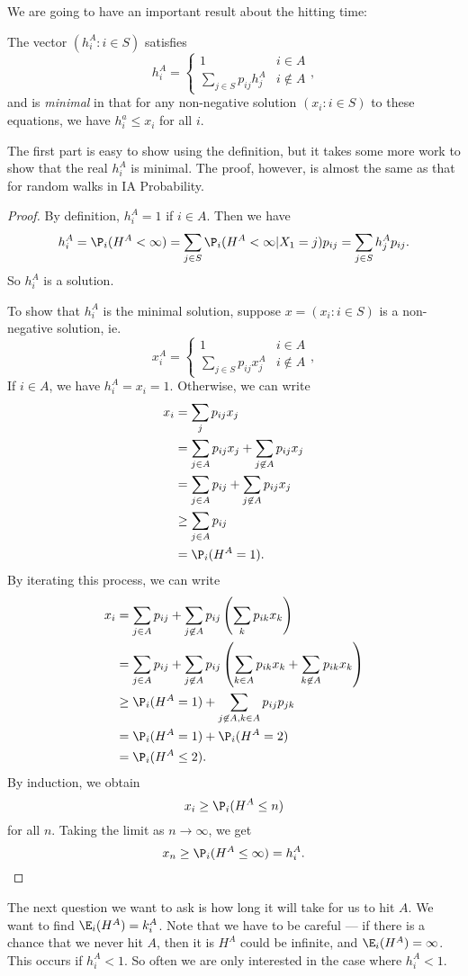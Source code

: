 \documentclass[a4paper]{article}
\begin{document}
We are going to have an important result about the hitting time:
\begin{thm}
  The vector $(h_i^A: i \in S)$ satisfies
  \[
    h_i^A =
    \begin{cases}
      1 & i \in A\\
      \sum_{j \in S}p_{ij}h_j^A & i \not \in A
    \end{cases},
  \]
  and is \emph{minimal} in that for any non-negative solution $(x_i: i \in S)$ to these equations, we have $h_i^a \leq x_i$ for all $i$.
\end{thm}
The first part is easy to show using the definition, but it takes some more work to show that the real $h_i^A$ is minimal. The proof, however, is almost the same as that for random walks in IA Probability.

\begin{proof}
  By definition, $h_i^A = 1$ if $i \in A$. Then we have
  \[
    h_i^A = \P_i(H^A < \infty) = \sum_{j\in S} \P_i(H^A < \infty | X_1 = j)p_{ij} = \sum_{j\in S}h_{j}^A p_{ij}.
  \]
  So $h_i^A$ is a solution.

  To show that $h_i^A$ is the minimal solution, suppose $x = (x_i: i \in S)$ is a non-negative solution, ie.
  \[
    x_i^A =
    \begin{cases}
      1 & i \in A\\
      \sum_{j \in S}p_{ij}x_j^A & i \not \in A
    \end{cases},
  \]
  If $i \in A$, we have $h_i^A = x_i = 1$. Otherwise, we can write
  \begin{align*}
    x_i &= \sum_j p_{ij}x_j \\
    &= \sum_{j \in A}p_{ij}x_j + \sum_{j \not\in A}p_{ij}x_j \\
    &= \sum_{j \in A}p_{ij} + \sum_{j \not\in A}p_{ij}x_j \\
    &\geq \sum_{j \in A}p_{ij}\\
    &= \P_i(H^A = 1).
  \end{align*}
  By iterating this process, we can write
  \begin{align*}
    x_i &= \sum_{j \in A} p_{ij} + \sum_{j \not\in A} p_{ij}\left(\sum_k p_{ik} x_k\right) \\
    &= \sum_{j \in A} p_{ij} + \sum_{j \not\in A} p_{ij}\left(\sum_{k\in A} p_{ik} x_k + \sum_{k \not\in A} p_{ik}x_k\right)\\
    &\geq \P_i (H^A = 1) + \sum_{j \not \in A, k \in A}p_{ij}p_{jk}\\
    &= \P_i(H^A = 1) + \P_i(H^A = 2)\\
    &= \P_i (H^A \leq 2).
  \end{align*}
  By induction, we obtain
  \[
    x_i \geq \P_i(H^A \leq n)
  \]
  for all $n$. Taking the limit as $n \to \infty$, we get
  \[
    x_n \geq \P_i(H^A \leq \infty) = h_i^A.
  \]
\end{proof}
The next question we want to ask is how long it will take for us to hit $A$. We want to find $\E_i(H^A) = k_i^A$. Note that we have to be careful --- if there is a chance that we never hit $A$, then it is $H^A$ could be infinite, and $\E_i(H^A) = \infty$. This occurs if $h_i^A < 1$. So often we are only interested in the case where $h_i^A < 1$.
\end{document}
